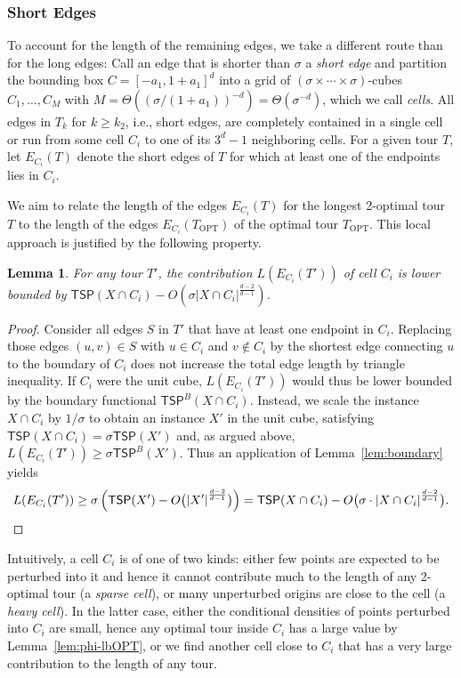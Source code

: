 \documentclass[11pt,DIV=12,a4paper]{scrartcl}
\newtheorem{lemma}[claim]{Lemma}
\newcommand{\TSP}{\mathsf{TSP}}
\newcommand{\OPT}{\mathrm{OPT}}
\begin{document}
\subsubsection{Short Edges}

To account for the length of the remaining edges, we take a different route than for the long edges: Call an edge that is shorter than $\sigma$ a \emph{short edge} and partition the bounding box $C=[-a_1,1+a_1]^d$ into a grid of $(\sigma \times \cdots \times \sigma)$-cubes $C_1,\dots, C_M$ with $M = \Theta((\sigma/(1+a_1))^{-d})=\Theta(\sigma^{-d})$, which we call \emph{cells}. All edges in $T_k$ for $k\ge k_2$, i.e., short edges, are completely contained in a single cell or run from some cell $C_i$ to one of its $3^d-1$ neighboring cells.  For a given tour $T$, let $E_{C_i}(T)$ denote the short edges of $T$ for which at least one of the endpoints lies in $C_i$. 

We aim to relate the length of the edges $E_{C_i}(T)$ for the longest 2-optimal tour $T$ to the length of the edges $E_{C_i}(T_\OPT)$ of the optimal tour $T_\OPT$. This local approach is justified by the following property.

\begin{lemma}\label{lem:boundTSP}
For any tour $T'$, the contribution $L(E_{C_i}(T'))$ of cell $C_i$ is lower bounded by $\TSP(X\cap C_i) - O(\sigma {|X\cap C_i|}^{\frac{d-2}{d-1}})$.
\end{lemma}
\begin{proof}%
Consider all edges $S$ in $T'$ that have at least one endpoint in $C_i$. Replacing those edges $(u,v) \in S$ with $u\in C_i$ and $v\notin C_i$ by the shortest edge connecting $u$ to the boundary of $C_i$ does not increase the total edge length by triangle inequality. If $C_i$ were the unit cube, $L(E_{C_i}(T'))$ would thus be lower bounded by the boundary functional $\TSP^B(X\cap C_i)$. Instead, we scale the instance $X\cap C_i$ by $1/\sigma$ to obtain an instance $X'$ in the unit cube, satisfying $\TSP(X\cap C_i) = \sigma \TSP(X')$ and, as argued above, $L(E_{C_i}(T')) \ge \sigma \TSP^B(X')$. Thus an application of Lemma~\ref{lem:boundary} yields 
\[ L(E_{C_i}(T')) \ge \sigma \left(\TSP(X') - O\bigl({|X'|}^{\frac{d-2}{d-1}}\bigr)\right) = \TSP(X\cap C_i) - O\bigl(\sigma \cdot {|X\cap C_i|}^{\frac{d-2}{d-1}}\bigr).\qedhere\]
\end{proof}


Intuitively, a cell $C_i$ is of one of two kinds: either few points are expected to be perturbed into it and hence it cannot contribute much to the length of any 2-optimal tour (a \emph{sparse cell}), or many unperturbed origins are close to the cell (a \emph{heavy cell}). In the latter case, either the conditional densities of points perturbed into $C_i$ are small, hence any optimal tour inside $C_i$ has a large value by Lemma~\ref{lem:phi-lbOPT}, or we find another cell close to $C_i$ that has a very large contribution to the length of any tour.
\end{document}
